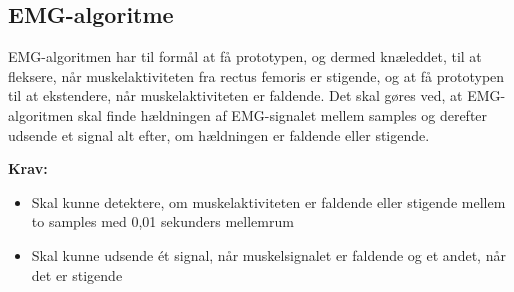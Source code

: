 \subsection{EMG-algoritme}\label{sec:krav_emg_algo}
EMG-algoritmen har til formål at få prototypen, og dermed knæleddet, til at fleksere, når muskelaktiviteten fra rectus femoris er stigende, og at få prototypen til at ekstendere, når muskelaktiviteten er faldende. Det skal gøres ved, at EMG-algoritmen skal finde hældningen af EMG-signalet mellem samples og derefter udsende et signal alt efter, om  hældningen er faldende eller stigende. 

\textbf{Krav:}
\begin{itemize}
\item Skal kunne detektere, om muskelaktiviteten er faldende eller stigende mellem to samples med 0,01 sekunders mellemrum
\item Skal kunne udsende ét signal, når muskelsignalet er faldende og et andet, når det er stigende
\end{itemize}

